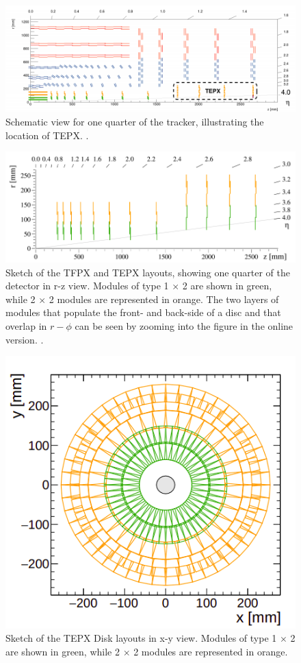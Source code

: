 \begin{figure}[H]
  \centering
  \includegraphics[width=0.6\columnwidth]{./up2.png}
  \caption{ \onehalfspacing Schematic view for one quarter of the tracker, illustrating the location of TEPX. \cite{}.}
  \label{fig:CMS}
\end{figure}


\begin{figure}[H]
  \centering
  \includegraphics[width=0.6\columnwidth]{./tepx.png}
  \caption{ \onehalfspacing Sketch of the TFPX and TEPX layouts, showing one quarter of the detector in r-z view. Modules of type 1 $\times$ 2 are shown in green, while 2 $\times$ 2 modules are represented in orange. The two layers of modules that populate the front- and back-side of a disc and that overlap in $r-\phi$ can be seen by zooming into the figure in the online version. \cite{}.}
  \label{fig:CMS}
\end{figure}


\begin{figure}[H]
  \centering
  \includegraphics[width=0.5 \columnwidth]{./xydisc.png}
  \caption{ \onehalfspacing Sketch of the TEPX Disk layouts in x-y view. Modules of type 1 $\times$ 2 are shown in green, while 2 $\times$ 2 modules are represented in orange.}
  \label{fig:CMS}
\end{figure}



